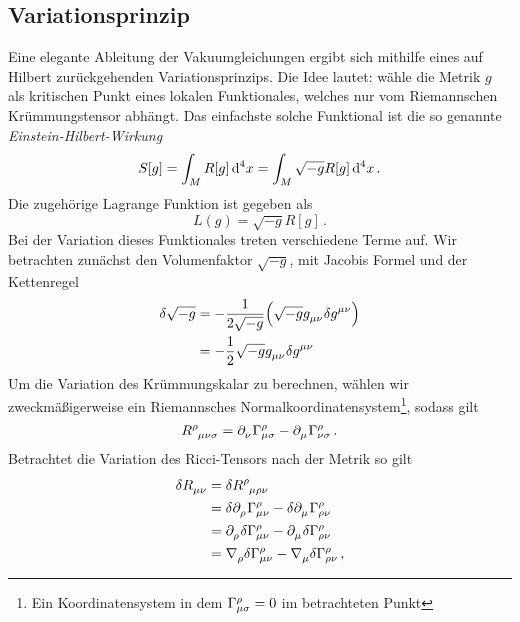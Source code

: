 \subsection{Variationsprinzip}
Eine elegante Ableitung der Vakuumgleichungen ergibt sich mithilfe eines auf
Hilbert zurückgehenden Variationsprinzips.
Die Idee lautet: wähle die Metrik $g$ als kritischen
Punkt eines lokalen Funktionales, welches nur vom Riemannschen Krümmungstensor
abhängt.
Das einfachste solche Funktional ist die so genannte
\emph{Einstein-Hilbert-Wirkung}
\begin{equation}
S[g]=\int_{M}R[g]\dif{}^4x = \int_{M}\sqrt{-g}R[g] \dif{}^4x \,.
\end{equation}
Die zugehörige Lagrange Funktion ist gegeben als
\begin{equation}
L(g)=\sqrt{-g}R[g]\,.
\end{equation}
Bei der Variation dieses Funktionales treten verschiedene Terme auf. Wir
betrachten zunächst den Volumenfaktor $\sqrt{-g}$, mit Jacobis Formel und der
Kettenregel
\begin{equation}
\begin{split}
\delta \sqrt{-g}
&= -\frac{1}{2\sqrt{-g}}  \left(\sqrt{-g}\tensor{g}{_\mu_\nu}
\delta\tensor{g}{^\mu^\nu} \right)\\
&= -\frac{1}{2}\sqrt{-g}\tensor{g}{_\mu_\nu}
\delta\tensor{g}{^\mu^\nu} \\
\end{split}
\end{equation}
Um die Variation des Krümmungskalar zu berechnen, wählen wir zweckmäßigerweise
ein Riemannsches Normalkoordinatensystem\footnote{Ein Koordinatensystem in dem
$\cSym{\rho}{\mu}{\sigma}=0$ im betrachteten Punkt}, sodass gilt
\begin{equation}
\tensor{R}{^\rho_\mu_\nu_\sigma}=\tensor{\partial}{_\nu}\cSym{\rho}{\mu}{\sigma}
-\tensor{\partial}{_\mu}\cSym{\rho}{\nu}{\sigma}\,.\\
\end{equation}
Betrachtet die Variation des Ricci-Tensors nach der Metrik so gilt
\begin{equation}
\begin{split}
\delta \tensor{R}{_\mu_\nu}
&=\delta \tensor{R}{^\rho_\mu_\rho_\nu}\\
&=\delta\tensor{\partial}{_\rho} \cSym{\rho}{\mu}{\nu}
-\delta\tensor{\partial}{_\mu} \cSym{\rho}{\rho}{\nu}\\
&=\tensor{\partial}{_\rho}\delta \cSym{\rho}{\mu}{\nu}
-\tensor{\partial}{_\mu}\delta \cSym{\rho}{\rho}{\nu}\\
&=\tensor{\nabla}{_\rho}\delta \cSym{\rho}{\mu}{\nu}
-\tensor{\nabla}{_\mu}\delta \cSym{\rho}{\rho}{\nu}\,,
\end{split}
\end{equation}
